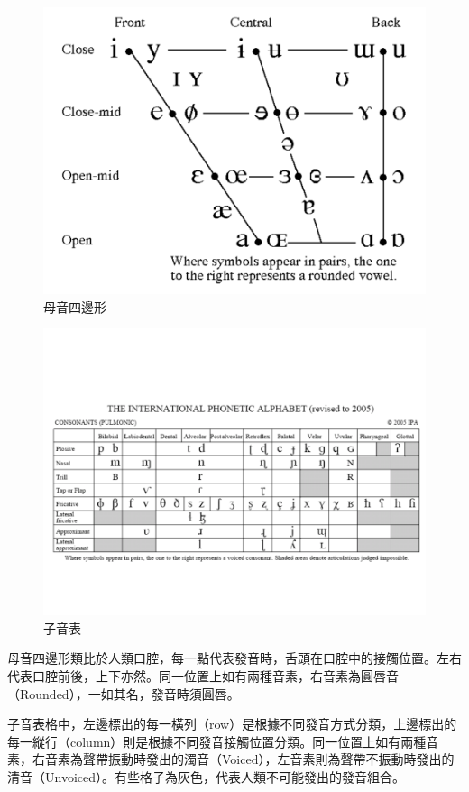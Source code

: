 \begin{figure}
\centering
\includegraphics[scale=0.4]{images/chap2_vowel_quadrilateral.png}
\caption{母音四邊形}
\label{fig:vowel}
\end{figure}

\begin{figure}
\centering
\includegraphics[scale=0.4]{images/chap2_consonant.png}
\caption{子音表}
\label{fig:consonant}
\end{figure}
母音四邊形類比於人類口腔，每一點代表發音時，舌頭在口腔中的接觸位置。左右代表口腔前後，上下亦然。同一位置上如有兩種音素，右音素為圓唇音（Rounded），一如其名，發音時須圓唇。

子音表格中，左邊標出的每一橫列（row）是根據不同發音方式分類，上邊標出的每一縱行（column）則是根據不同發音接觸位置分類。同一位置上如有兩種音素，右音素為聲帶振動時發出的濁音（Voiced），左音素則為聲帶不振動時發出的清音（Unvoiced）。有些格子為灰色，代表人類不可能發出的發音組合。

